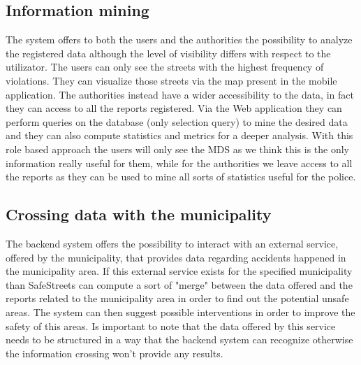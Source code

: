 \subsection{Information mining}
The system offers to both the users and the authorities the possibility to analyze the registered data although the level of visibility differs with respect to the utilizator. 
The users can only see the streets with the highest frequency of violations. They can visualize those streets via the map present in the mobile application. The authorities instead have a wider accessibility to the data, in fact they can access to all the reports registered. Via the Web application they can perform queries on the database (only selection query) to mine the desired data and they can also compute statistics and metrics for a deeper analysis.
With this role based approach the users will only see the MDS as we think this is the only information really useful for them, while for the authorities we leave access to all the reports as they can be used to mine all sorts of statistics useful for the police.

\subsection{Crossing data with the municipality}
The backend system offers the possibility to interact with an external service, offered by the municipality, that provides data regarding accidents happened in the municipality area. If this external service exists for the specified municipality than SafeStreets can compute a sort of "merge" between the data offered and the reports related to the municipality area in order to find out the potential unsafe areas. The system can then suggest possible interventions in order to improve the safety of this areas. Is important to note that the data offered by this service needs to be structured in a way that the backend system can recognize otherwise the information crossing won't provide any results.
